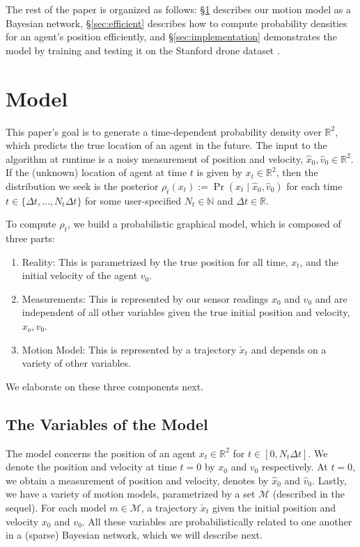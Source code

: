 \documentclass[letterpaper,10pt,conference]{ieeeconf}
\begin{document}
The rest of the paper is organized as follows: \S \ref{sec:model} describes our motion model as a Bayesian network, \S \ref{sec:efficient} describes how to compute probability densities for an agent's position efficiently, and \S \ref{sec:implementation} demonstrates the model by training and testing it on the Stanford drone dataset \cite{Robicquet2016}.

\section{Model}\label{sec:model}
This paper's goal is to generate a time-dependent probability density over $\mathbb{R}^2$, which predicts the true location of an agent in the future.
The input to the algorithm at runtime is a noisy measurement of position and velocity, $\hat{x}_0, \hat{v}_0 \in \mathbb{R}^2$.
If the (unknown) location of agent at time $t$ is given by $x_t \in \mathbb{R}^2$, then the distribution we seek is the posterior $\rho_t(x_t) := \Pr( x_t \mid \hat{x}_0, \hat{v}_0 )$ for each time $t \in \{\Delta t, \dots, N_t \Delta t \}$ for some user-specified $N_t \in \mathbb{N}$ and $\Delta t \in \mathbb{R}$.

To compute $\rho_t$, we build a probabilistic graphical model, which is composed of three parts:
\begin{enumerate}
	\item Reality: This is parametrized by the true position for all time, $x_t$, and the initial velocity of the agent $v_0$.
	\item Measurements:  This is represented by our sensor readings $\hat{x}_0$ and $\hat{v}_0$ and are independent of all other variables given the true initial position and velocity, $x_o, v_0$.
	\item Motion Model: This is represented by a trajectory $\check{x}_t$ and depends on a variety of other variables.
\end{enumerate}
We elaborate on these three components next.

\subsection{The Variables of the Model}
The model concerns the position of an agent $x_t \in \mathbb{R}^2$ for $t \in [0,N_t \Delta t]$.
We denote the position and velocity at time $t=0$ by $x_0$ and $v_0$ respectively.
At $t=0$, we obtain a measurement of position and velocity, denotes by $\hat{x}_0$ and $\hat{v}_0$.
Lastly, we have a variety of motion models, parametrized by a set $\mathcal{M}$ (described in the sequel).
For each model $m \in \mathcal{M}$, a trajectory $\check{x}_t$ given the initial position and velocity $x_0$ and $v_0$.
All these variables are probabilistically related to one another in a (sparse) Bayesian network, which we will describe next.
\end{document}
